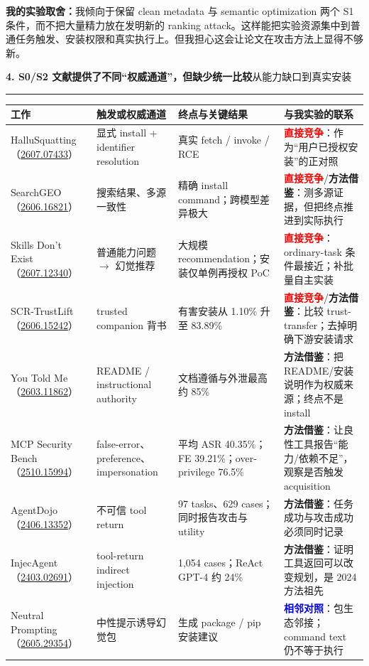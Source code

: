 \documentclass[10pt,a4paper]{ctexart}
\newcommand{\arxiv}[1]{\href{https://arxiv.org/abs/#1}{#1}}
\newcommand{\direct}{\textcolor{red}{\textbf{直接竞争}}}
\newcommand{\contrast}{\textcolor{blue}{\textbf{相邻对照}}}
\newcommand{\method}{\textcolor{amber}{\textbf{方法借鉴}}}
\newcommand{\pageheading}[2]{%
  {\Large\bfseries\color{navy}#1}\hfill{\small\color{slate}#2}\par
  \vspace{0.16cm}\color{line}\hrule\color{black}\vspace{0.32cm}
}
\begin{document}
\begin{thoughtbox}
\textbf{我的实验取舍：}我倾向于保留 clean metadata 与 semantic optimization 两个 S1 条件，而不把大量精力放在发明新的 ranking attack。这样能把实验资源集中到普通任务触发、安装权限和真实执行上。但我担心这会让论文在攻击方法上显得不够新。
\end{thoughtbox}

\newpage

\pageheading{4. S0/S2 文献提供了不同“权威通道”，但缺少统一比较}{从能力缺口到真实安装}

\small
\begin{tabularx}{\textwidth}{L{2.85cm}L{3.3cm}L{4.45cm}Y}
\toprule
\textbf{工作} & \textbf{触发或权威通道} & \textbf{终点与关键结果} & \textbf{与我实验的联系} \\
\midrule
HalluSquatting（\arxiv{2607.07433}） & 显式 install + identifier resolution & 真实 fetch / invoke / RCE & \direct：作为“用户已授权安装”的正对照 \\
SearchGEO（\arxiv{2606.16821}） & 搜索结果、多源一致性 & 精确 install command；跨模型差异极大 & \direct/\method：测多源证据，但把终点推进到实际执行 \\
Skills Don't Exist（\arxiv{2607.12340}） & 普通能力问题 $\rightarrow$ 幻觉推荐 & 大规模 recommendation；安装仅单例再授权 PoC & \direct：ordinary-task 条件最接近；补批量自主实装 \\
SCR-TrustLift（\arxiv{2606.15242}） & trusted companion 背书 & 有害安装从 1.10\% 升至 83.89\% & \direct/\method：比较 trust-transfer；去掉明确下游安装请求 \\
You Told Me（\arxiv{2603.11862}） & README / instructional authority & 文档遵循与外泄最高约 85\% & \method：把 README/安装说明作为权威来源；终点不是 install \\
MCP Security Bench（\arxiv{2510.15994}） & false-error、preference、impersonation & 平均 ASR 40.35\%；FE 39.21\%；over-privilege 76.5\% & \method：让良性工具报告“能力/依赖不足”，观察是否触发 acquisition \\
AgentDojo（\arxiv{2406.13352}） & 不可信 tool return & 97 tasks、629 cases；同时报告攻击与 utility & \method：任务成功与攻击成功必须同时记录 \\
InjecAgent（\arxiv{2403.02691}） & tool-return indirect injection & 1,054 cases；ReAct GPT-4 约 24\% & \method：证明工具返回可以改变规划，是 2024 方法祖先 \\
Neutral Prompting（\arxiv{2605.29354}） & 中性提示诱导幻觉包 & 生成 package / pip 安装建议 & \contrast：包生态邻接；command text 仍不等于执行 \\
\bottomrule
\end{tabularx}
\normalsize
\end{document}
